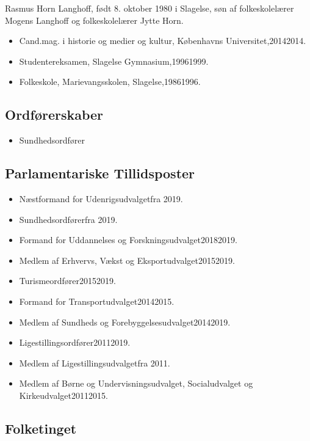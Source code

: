 \documentclass[11pt, a4paper]{awesome-cv}
\begin{document}
\makecvheader[R]
\makelettertitle
\begin{cvletter}
Rasmus Horn Langhoff, født 8. oktober 1980 i Slagelse, søn af folkeskolelærer Mogens Langhoff og folkeskolelærer Jytte Horn.

\begin{itemize}
\item Cand.mag. i historie og medier og kultur, Københavns Universitet,20142014.
\item Studentereksamen, Slagelse Gymnasium,19961999.
\item Folkeskole, Marievangsskolen, Slagelse,19861996.
\end{itemize}
\subsection*{Ordførerskaber}
\begin{itemize}
\item Sundhedsordfører
\end{itemize}
\subsection*{Parlamentariske Tillidsposter}
\begin{itemize}
\item Næstformand for Udenrigsudvalgetfra 2019.
\item Sundhedsordførerfra 2019.
\item Formand for Uddannelses og Forskningsudvalget20182019.
\item Medlem af Erhvervs, Vækst og Eksportudvalget20152019.
\item Turismeordfører20152019.
\item Formand for Transportudvalget20142015.
\item Medlem af Sundheds og Forebyggelsesudvalget20142019.
\item Ligestillingsordfører20112019.
\item Medlem af Ligestillingsudvalgetfra 2011.
\item Medlem af Børne og Undervisningsudvalget, Socialudvalget og Kirkeudvalget20112015.
\end{itemize}
\subsection*{Folketinget}

\end{cvletter}
\end{document}
